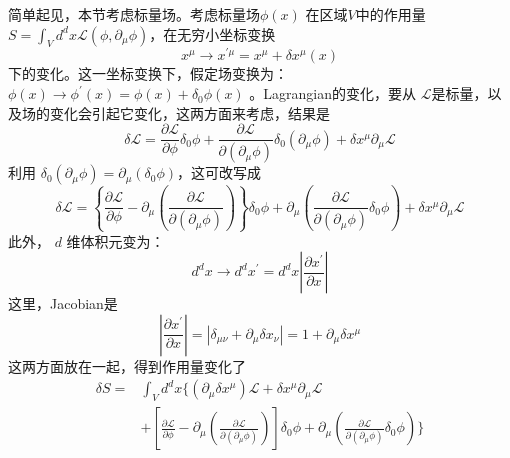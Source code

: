 简单起见，本节考虑标量场。考虑标量场$ \phi(x)$ 在区域$ V $中的作用量 $S=\int_{V} d^{d} x \mathcal{L}\left(\phi, \partial_{\mu} \phi\right) $，在无穷小坐标变换
\begin{equation}
	x^{\mu} \rightarrow x^{\prime \mu}=x^{\mu}+\delta x^{\mu}(x)
\end{equation}
下的变化。这一坐标变换下，假定场变换为：$ \phi(x) \rightarrow \phi^{\prime}(x)=\phi(x)+\delta_0 \phi(x)$ 。Lagrangian的变化，要从 $\mathcal{L} $是标量，以及场的变化会引起它变化，这两方面来考虑，结果是
\begin{equation}
		\delta \mathcal{L}=\frac{\partial \mathcal{L}}{\partial \phi} \delta_{0} \phi+\frac{\partial \mathcal{L}}{\partial\left(\partial_{\mu} \phi\right)} \delta_{0}\left(\partial_{\mu} \phi\right)+\delta x^{\mu} \partial_{\mu} \mathcal{L}
\end{equation}
利用 $\delta_0(\partial_\mu \phi)=\partial_\mu(\delta_0 \phi) $，这可改写成
\begin{equation}
	\delta \mathcal{L}=\left\{\frac{\partial \mathcal{L}}{\partial \phi}-\partial_{\mu}\left(\frac{\partial \mathcal{L}}{\partial\left(\partial_{\mu} \phi\right)}\right)\right\} \delta_{0} \phi+\partial_{\mu}\left(\frac{\partial \mathcal{L}}{\partial\left(\partial_{\mu} \phi\right)} \delta_{0} \phi\right)+\delta x^{\mu} \partial_{\mu} \mathcal{L}
\end{equation}
此外， $d$ 维体积元变为：
\begin{equation}
	d^{d} x \rightarrow d^{d} x^{\prime}=d^{d} x\left|\frac{\partial x^{\prime}}{\partial x}\right|
\end{equation}
这里，Jacobian是
\begin{equation}
	\left|\frac{\partial x^{\prime}}{\partial x}\right|=\left|\delta_{\mu \nu}+\partial_{\mu} \delta x_{\nu}\right|=1+\partial_{\mu} \delta x^{\mu}
\end{equation}
这两方面放在一起，得到作用量变化了
\begin{equation}
	\begin{aligned} \delta S=&\int_{V} d^{d} x\Bigg\{(\partial_{\mu} \delta x^{\mu}) \mathcal{L}+\delta x^{\mu} \partial_{\mu} \mathcal{L} \\&+\left[\frac{\partial \mathcal{L}}{\partial \phi}-\partial_{\mu}\left(\frac{\partial \mathcal{L}}{\partial\left(\partial_{\mu} \phi\right)}\right)\right] \delta_{0} \phi+\partial_{\mu}\left(\frac{\partial \mathcal{L}}{\partial\left(\partial_{\mu} \phi\right)} \delta_{0} \phi\right)\Bigg\}\end{aligned}
\end{equation}
